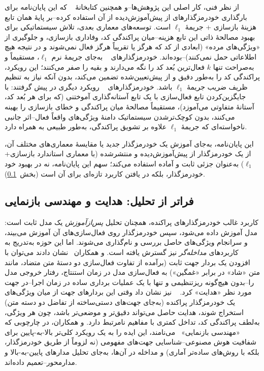 از نظر فنی، کار اصلی این پژوهش‌ها--و همچنین کتابخانهٔ
~\cite{bloom2024saelens}
که این پایان‌نامه برای بارگذاری خودرمزگذارهای از پیش‌آموزش‌دیده از آن استفاده کرده--بر پایهٔ همان تابع هزینهٔ بازسازی + جریمهٔ
$\ell_1$
است. توسعه‌های معماری بعدی، تلاش سیستماتیکی برای بهبود مصالحهٔ ذاتی این تابع هزینه--میان پراکندگی کد، وفاداری بازسازی، و جلوگیری از «ویژگی‌های مرده»
(ابعادی از کد که هرگز یا تقریباً هرگز فعال نمی‌شوند و در نتیجه هیچ اطلاعاتی حمل نمی‌کنند)--بوده‌اند. خودرمزگذارهای
~\cite{gao2024topk}
به‌جای جریمهٔ نرم
$\ell_1$، مستقیماً و به‌صراحت تنها
$k$
فعال‌ترین بُعد کد را نگه می‌دارند و بقیه را صفر می‌کنند؛ این رویکرد، پراکندگی کد را به‌طور دقیق و از پیش‌تعیین‌شده تضمین می‌کند، بدون آنکه نیاز به تنظیم ظریف ضریب جریمهٔ
$\ell_1$
باشد. خودرمزگذارهای
~\cite{rajamanoharan2024jumprelu}
رویکرد دیگری در پیش گرفتند: با جایگزین‌کردن تابع فعال‌سازی
با یک تابع آستانه‌گذاری آموختنی (که برای هر بُعد کد، آستانهٔ متفاوتی می‌آموزد)، مستقیماً مصالحهٔ میان پراکندگی و خطای بازسازی را بهینه می‌کنند، بدون کوچک‌ترشدن سیستماتیک دامنهٔ ویژگی‌های واقعاً فعال--اثر جانبی ناخواسته‌ای که جریمهٔ
$\ell_1$
علاوه بر تشویق پراکندگی، به‌طور طبیعی به همراه دارد.

این پایان‌نامه، به‌جای آموزش یک خودرمزگذار جدید یا مقایسهٔ معماری‌های مختلف آن، از یک خودرمزگذار از پیش‌آموزش‌دیده و منتشرشده (با معماری استاندارد بازسازی+
$\ell_1$) به‌عنوان جزئی ثابت و آماده استفاده می‌کند؛ سهم این پایان‌نامه، نه در بهبود خود خودرمزگذار، بلکه در یافتن کاربرد تازه‌ای برای آن است (بخش~\ref{sec:lit-steering}).

\subsection{فراتر از تحلیل: هدایت و مهندسی بازنمایی}
\label{sec:lit-steering}
کاربرد غالب خودرمزگذارهای پراکنده، همچنان تحلیل \emph{پس‌ازآموزش} یک مدل ثابت است: مدل آموزش داده می‌شود، سپس خودرمزگذار روی فعال‌سازی‌های آن آموزش می‌بیند، و سرانجام ویژگی‌های حاصل بررسی و نام‌گذاری می‌شوند. اما این حوزه به‌تدریج به کاربردهای \emph{مداخله‌گر} نیز گسترش یافته است.
و همکاران~\cite{turner2023actadd}
نشان دادند می‌توان با افزودن یک بردار جهت ثابت (برآمده از تفاوت فعال‌سازی دو دستهٔ متن متضاد، مانند متن «شاد» در برابر «غمگین») به فعال‌سازی مدل در زمان استنتاج، رفتار خروجی مدل را--بدون هیچ‌گونه ریزتنظیمی و تنها با یک عملیات برداری ساده در زمان اجرا--در جهت مورد نظر «هدایت»
کرد.
~\cite{templeton2024scaling}
نیز نشان داد وقتی این بردارهای جهت از میان ویژگی‌های یک خودرمزگذار پراکنده (به‌جای جهت‌های دستی‌ساخته از تفاضل دو دسته متن) استخراج شوند، هدایت حاصل می‌تواند دقیق‌تر و موضعی‌تر باشد، چون هر ویژگی، به‌لطف پراکندگی کد، تداخل کمتری با مفاهیم نامرتبط دارد.
و همکاران، در چارچوبی که «مهندسی بازنمایی»~\cite{zou2023repe}
می‌نامند، این ایده را به یک رویکرد کلی‌تر بالا-به-پایین برای شفافیت هوش مصنوعی--شناسایی جهت‌های مفهومی (نه لزوماً از طریق خودرمزگذار، بلکه با روش‌های ساده‌تر آماری) و مداخله در آن‌ها، به‌جای تحلیل مدارهای پایین-به-بالا و مدارمحور--تعمیم داده‌اند.

